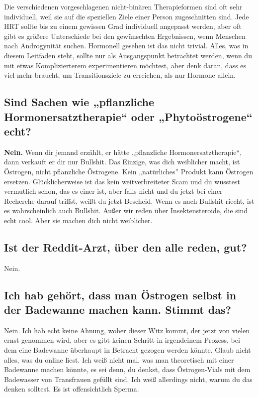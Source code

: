 \documentclass{article}
\begin{document}
{{{Die verschiedenen vorgeschlagenen nicht-binären Therapieformen sind oft sehr individuell, weil sie auf die speziellen Ziele einer Person zugeschnitten sind. Jede HRT sollte bis zu einem gewissen Grad individuell angepasst werden, aber oft gibt es größere Unterschiede bei den gewünschten Ergebnissen, wenn Menschen nach Androgynität suchen. Hormonell gesehen ist das nicht trivial. Alles, was in diesem Leitfaden steht, sollte nur als Ausgangspunkt betrachtet werden, wenn du mit etwas Komplizierterem experimentieren möchtest, aber denk daran, dass es viel mehr braucht, um Transitionsziele zu erreichen, als nur Hormone allein.

\subsection{Sind Sachen wie „pflanzliche Hormonersatztherapie“ oder „Phytoöstrogene“ echt?}

\textbf{Nein.} Wenn dir jemand erzählt, er hätte „pflanzliche Hormonersatztherapie“, dann verkauft er dir nur Bullshit. Das Einzige, was dich weiblicher macht, ist Östrogen, nicht pflanzliche Östrogene. Kein „natürliches” Produkt kann Östrogen ersetzen. Glücklicherweise ist das kein weitverbreiteter Scam und du wusstest vermutlich schon, das es einer ist, aber falls nicht und du jetzt bei einer Recherche darauf triffst, weißt du jetzt Bescheid. Wenn es nach Bullshit riecht, ist es wahrscheinlich auch Bullshit. Außer wir reden über Insektensteroide, die sind echt cool. Aber sie machen dich nicht weiblicher.

\subsection{Ist der Reddit-Arzt, über den alle reden, gut?}

Nein.

\subsection{Ich hab gehört, dass man Östrogen selbst in der Badewanne machen kann. Stimmt das?}

Nein. Ich hab echt keine Ahnung, woher dieser Witz kommt, der jetzt von vielen ernst genommen wird, aber es gibt keinen Schritt in irgendeinem Prozess, bei dem eine Badewanne überhaupt in Betracht gezogen werden könnte. Glaub nicht alles, was du online liest. Ich weiß nicht mal, was man theoretisch mit einer Badewanne machen könnte, es sei denn, du denkst, dass Östrogen-Vials mit dem Badewasser von Transfrauen gefüllt sind. Ich weiß allerdings nicht, warum du das denken solltest. Es ist offensichtlich Sperma.

}}}
\end{document}
